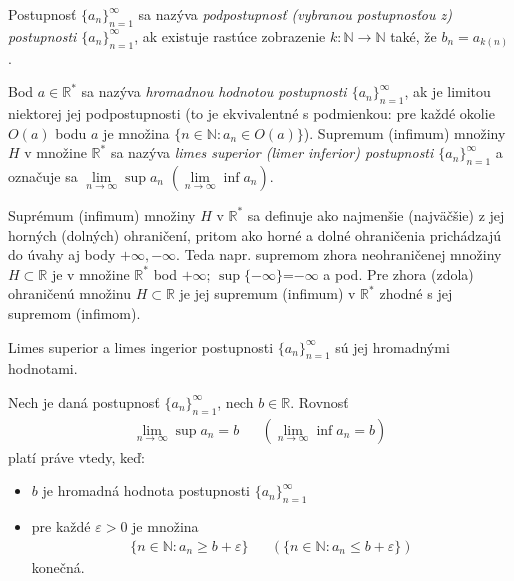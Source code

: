 Postupnosť ${\{a_n\}}_{n=1}^\infty$ sa nazýva \textit{podpostupnosť (vybranou
postupnosťou z) postupnosti ${\{a_n\}}_{n=1}^\infty$}, ak existuje rastúce
zobrazenie $k: \mathbb{N} \rightarrow \mathbb{N}$ také, že $b_n=a_{k(n)}$.

Bod $a \in \mathbb{R^*}$ sa nazýva \textit{hromadnou hodnotou postupnosti
${\{a_n\}}_{n=1}^\infty$}, ak je limitou niektorej jej podpostupnosti (to je
ekvivalentné s podmienkou: pre každé okolie $O(a)$ bodu $a$ je množina $\{n \in
\mathbb{N}: a_n \in O(a) \}$). Supremum (infimum) množiny $H$ v množine
$\mathbb{R^*}$ sa nazýva \textit{limes superior (limer inferior) postupnosti
${\{a_n\}}_{n=1}^\infty$} a označuje sa $\lim\limits_{n \rightarrow \infty}\sup
a_n$ $(\lim\limits_{n \rightarrow \infty} \inf a_n)$.

Suprémum (infimum) množiny $H$ v $\mathbb{R^*}$ sa definuje ako najmenšie
(najväčšie) z jej horných (dolných) ohraničení, pritom ako horné a dolné
ohraničenia prichádzajú do úvahy aj body $+\infty,-\infty$. Teda napr.
supremom zhora neohraničenej množiny $H \subset \mathbb{R}$ je v množine
$\mathbb{R^*}$ bod $+\infty$; $\sup\{-\infty\}$=$-\infty$ a pod. Pre zhora
(zdola) ohraničenú množinu $H \subset \mathbb{R}$ je jej supremum (infimum) v
$\mathbb{R^*}$ zhodné s jej supremom (infimom).

\begin{veta}
Limes superior a limes ingerior postupnosti ${\{a_n\}}_{n=1}^\infty$ sú jej
hromadnými hodnotami.
\end{veta}

\begin{veta}
Nech je daná postupnosť ${\{a_n\}}_{n=1}^\infty$, nech $b \in \mathbb{R}$.
Rovnosť
\begin{align*}
  \lim\limits_{n \rightarrow \infty} \sup a_n =b
  && (\lim\limits_{n \rightarrow \infty} \inf a_n =b)
\end{align*}
platí práve vtedy, keď:
\begin{itemize}
\item $b$ je hromadná hodnota postupnosti ${\{a_n\}}_{n=1}^\infty$
\item
  pre každé $\varepsilon > 0$ je množina
  \begin{align*}
    \{ n \in \mathbb{N}: a_n \geq b +\varepsilon \}
    && (\{  n \in \mathbb{N}: a_n \leq b +\varepsilon \} )
  \end{align*}
  konečná.
\end{itemize}
\end{veta}

